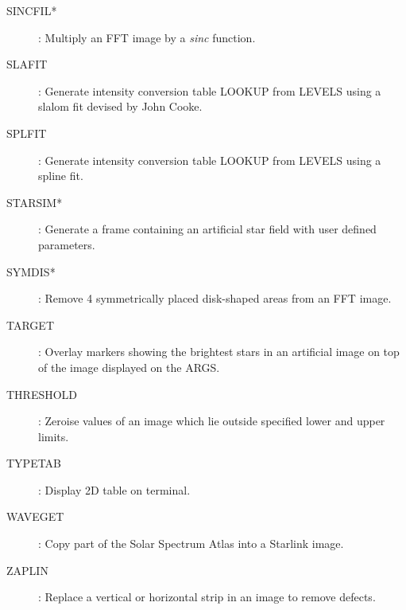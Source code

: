 \begin{description}
\item [SINCFIL*]: Multiply an FFT image by a {\em sinc} function.
\item [SLAFIT]: Generate intensity conversion table LOOKUP from LEVELS using
a slalom fit devised by John Cooke.
\item [SPLFIT]: Generate intensity conversion table LOOKUP from LEVELS using a
spline fit.
\item [STARSIM*]: Generate a frame containing  an artificial star field with
user defined parameters.
\item [SYMDIS*]: Remove 4 symmetrically placed disk-shaped areas from an FFT
image.
\item [TARGET]: Overlay markers showing the brightest stars in an artificial
image on top of the image displayed on the ARGS.
\item [THRESHOLD]: Zeroise values of an image which lie outside specified
lower and upper limits.
\item [TYPETAB]: Display 2D table on terminal.
\item [WAVEGET]: Copy part of the Solar Spectrum Atlas into a Starlink image.
\item [ZAPLIN]: Replace a vertical or horizontal strip in an image to remove
defects.
\end{description}
